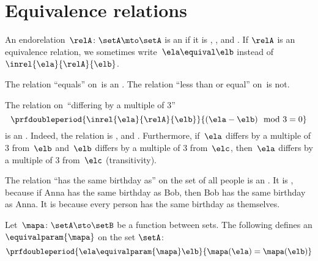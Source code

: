 
\section{Equivalence relations}

\begin{ctdefinition}
    \label{def:equivalence-relation}
    An endorelation~$\relA\colon \setA\mto \setA$ is an  if it is , , and .
    If $\relA$ is an equivalence relation, we sometimes write~$\ela\equival \elb$ instead of~$\inrel{\ela}{\relA}{\elb}$.
\end{ctdefinition}

\begin{example}
    The relation ``equals'' on~\natnumbers is an .
    The relation ``less than or equal'' on~\natnumbers is not.
\end{example}

\begin{example}
    The relation on~\natnumbers ``differing by a multiple of 3''
    \begin{equation}
        \prfdoubleperiod{
            \inrel{\ela}{\relA}{\elb}
        }{
            (\ela-\elb) \mod 3 = 0
        }
    \end{equation}
    is an .
    Indeed, the relation is , and .
    Furthermore, if~$\ela$ differs by a multiple of 3 from~$\elb$ and~$\elb$ differs by a multiple of 3 from~$\elc$, then~$\ela$ differs by a multiple of 3 from~$\elc$ (transitivity).
\end{example}

\begin{example}
    The relation ``has the same birthday as'' on the set of all people is an .
    It is , because if Anna has the same birthday as Bob, then Bob has the same birthday as Anna.
    It is  because every person has the same birthday as themselves.
\end{example}

\begin{example}
    Let~$\mapa\colon \setA \sto \setB$ be a function between sets.
    The following defines an  $\equivalparam{\mapa}$ on the set $\setA$:
    \begin{equation}
        \prfdoubleperiod{
            \ela\equivalparam{\mapa} \elb
        }{
            \mapa(\ela)=\mapa(\elb)
        }
    \end{equation}
\end{example}

